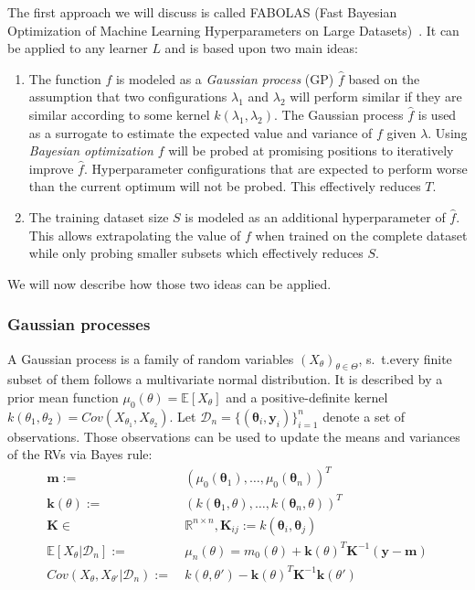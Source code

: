 The first approach we will discuss is called FABOLAS (Fast Bayesian Optimization of Machine Learning Hyperparameters on Large Datasets)~\cite{Klein2016}.
It can be applied to any learner \(L\) and is based upon two main ideas:
\begin{enumerate}
	\item The function \(f\) is modeled as a \textit{Gaussian process} (GP) \(\hat{f}\) based on the assumption that two configurations \(\lambda_1\) and \(\lambda_2\) will perform similar if they are similar according to some kernel \(k(\lambda_1, \lambda_2)\).
		The Gaussian process \(\hat{f}\) is used as a surrogate to estimate the expected value and variance of \(f\) given \(\lambda\).
		Using \textit{Bayesian optimization} \(f\) will be probed at promising positions to iteratively improve \(\hat{f}\).
		Hyperparameter configurations that are expected to perform worse than the current optimum will not be probed.
		This effectively reduces \(T\).
	\item The training dataset size \(S\) is modeled as an additional hyperparameter of \(\hat{f}\).
		This allows extrapolating the value of \(f\) when trained on the complete dataset while only probing smaller subsets
		which effectively reduces \(S\).
\end{enumerate}
We will now describe how those two ideas can be applied.

\subsubsection{Gaussian processes}%
\label{sec:hyperparams:fabolas:gaussian}

A Gaussian process is a family of random variables \((X_\theta)_{\theta \in \Theta}\), s.~t.\@ every finite subset of them follows a multivariate normal distribution.
It is described by a prior mean function \(\mu_0(\theta) = \mathbb{E}[X_\theta]\) and a positive-definite kernel \(k(\theta_1, \theta_2) = \mathit{Cov}(X_{\theta_1}, X_{\theta_2})\).
Let \(\mathcal{D}_n = \{(\bm{\theta}_i, \bm{y}_i)\}_{i = 1}^{n}\) denote a set of observations.
Those observations can be used to update the means and variances of the RVs via Bayes rule:
\begin{align}
	\bm{m} :=&\ (\mu_0(\bm{\theta}_1), \dots, \mu_0(\bm{\theta}_n))^T \nonumber \\
	\bm{k}(\theta) :=&\ (k(\bm{\theta}_1, \theta), \dots, k(\bm{\theta}_n, \theta))^T \nonumber \\
	\bm{K} \in&\ \mathbb{R}^{n \times n}, \bm{K}_{ij} := k(\bm{\theta}_i, \bm{\theta}_j) \nonumber \\
	\mathbb{E}[X_\theta | \mathcal{D}_n] :=&\ \mu_n(\theta) = m_0(\theta) + \bm{k}(\theta)^T \bm{K}^{-1} (\bm{y} - \bm{m}) \\
	\mathit{Cov}(X_\theta, X_{\theta'} | \mathcal{D}_n) :=&\ k(\theta, \theta') - \bm{k}(\theta)^T \bm{K}^{-1} \bm{k}(\theta')
\end{align}

